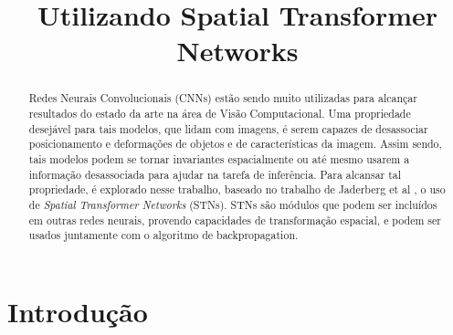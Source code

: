 \documentclass[conference]{IEEEtran}
\begin{document}
\title{Utilizando Spatial Transformer Networks}


\author{
\and
{}
}

\maketitle

\begin{abstract}
Redes Neurais Convolucionais (CNNs) estão sendo muito utilizadas para alcançar resultados do estado da arte na área de Visão Computacional. Uma propriedade desejável para tais modelos, que lidam com imagens, é serem capazes de desassociar posicionamento e deformações de objetos e de características da imagem. Assim sendo, tais modelos podem se tornar invariantes espacialmente ou até mesmo usarem a informação desassociada para ajudar na tarefa de inferência.
Para alcansar tal propriedade, é explorado nesse trabalho, baseado no trabalho de Jaderberg et al \cite{jaderberg2015spatial}, o uso de \textit{Spatial Transformer Networks} (STNs). STNs são módulos que podem ser incluídos em outras redes neurais, provendo capacidades de transformação espacial, e podem ser usados juntamente com o algoritmo de backpropagation.
\end{abstract}


\IEEEpeerreviewmaketitle

\section{Introdução}
\end{document}
